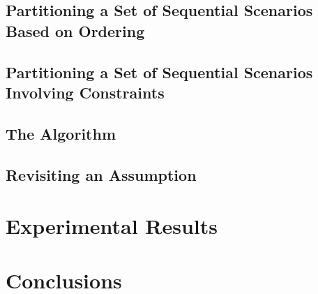 \documentclass[runningheads,a4paper]{llncs}
\begin{document}
\subsection{Partitioning a Set of Sequential Scenarios Based on
Ordering}
\label{sec-no-time}

\subsection{Partitioning a Set of Sequential Scenarios Involving Constraints}
\label{sec-full}

\subsection{The Algorithm}
\label{sec-algo}

\subsection{Revisiting an Assumption}
\label{sec-relax}

\section{Experimental Results}\label{sec-experiments}

\section{Conclusions}\label{sec-conclusions}







%

%

\end{document}
